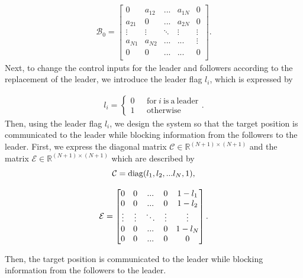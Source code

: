 \documentclass[a4paper,fleqn,10pt,twocolumn]{SICE_ISCS}
\begin{document}
\begin{align}
	{\mathcal{B}}_0=
	\begin{bmatrix}
		0     & a_{12} & ... & a_{1N} & 0\\
		a_{21}& 0 & ... & a_{2N} & 0\\
		\vdots& \vdots & \ddots &\vdots& \vdots\\
		a_{N1}& a_{N2}&...&... & \vdots\\
		0 & 0 & ... &...& 0\\ 
	\end{bmatrix}.
\end{align}
Next, to change the control inputs for the leader and followers according to the replacement of the leader, we introduce the leader flag \(l_i\), which is expressed by

\begin{align}
	l_i=
	\begin{cases}
		0 &\ \ \  {\mathrm{for}}\ i\ \mathrm{is\ a\ leader}\\
		1 &\ \ \  \mathrm{otherwise}
	\end{cases}.
\end{align}
Then, using the leader flag \(l_i\), we design the system so that the target position is communicated to the leader while blocking information from the followers to the leader. First, we express the diagonal matrix \({\mathcal{C}} \in {\mathbb{R}}^{(N+1) \times (N+1)}\) and the matrix \({\mathcal{E}} \in {\mathbb{R}}^{(N+1) \times (N+1)}\) which are described by
\begin{equation}
	{\mathcal{C}}={\mathrm{diag}}(l_1,l_2,...l_{N},1),
	\vspace{-2mm}
\end{equation}

\begin{align}
	\mathcal{E}=
	\begin{bmatrix}
		0     & 0      & ...    & 0    & 1-l_1\\
		0     & 0      & ...    & 0    & 1-l_2\\
		\vdots& \vdots & \ddots &\vdots& \vdots\\
		0     & 0      & ...    &0     & 1-l_N\\
		0     & 0      & ...    &0     & 0\\ 
	\end{bmatrix}.
	\vspace{-2mm}
\end{align}

Then, the target position is communicated to the leader while blocking information from the followers to the leader.
\end{document}
